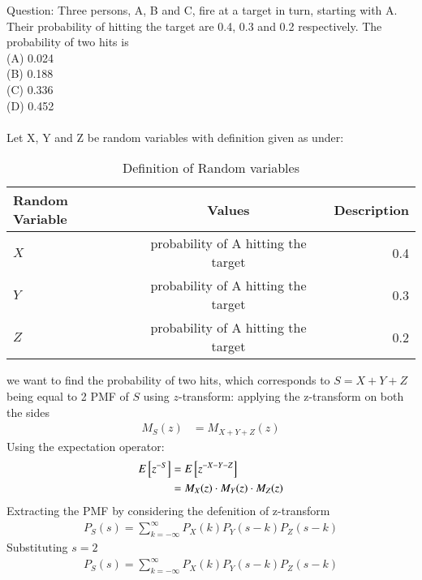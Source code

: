 \documentclass[journal,12pt,onecolumn]{IEEEtran}
\theoremstyle{remark}
\begin{document}
\let\vec\mathbf




\vspace{3cm}



\bigskip

\renewcommand{\thefigure}{\theenumi}
\renewcommand{\thetable}{\theenumi}
Question: Three persons, A, B and C, fire at a target in turn, starting with A. Their probability of hitting the target are 0.4, 0.3 and 0.2 respectively. The probability of two hits is\\
(A) 0.024\\
(B) 0.188\\
(C) 0.336\\
(D) 0.452\\
\solution \\
Let X, Y and Z be random variables with definition given as under:
\begin{table}[h]
\centering
\begin{tabular}{|l|c|r|}
\hline
    Random Variable & Values & Description\\
    \hline
    $X$ & probability of A hitting the target & 0.4 \\
    \hline
    $Y$ & probability of A hitting the target & 0.3\\
    \hline
    $Z$ & probability of A hitting the target& 0.2\\
    \hline
\end{tabular}
\label{tab:ncert/12/13/3/76/}
\caption{Definition of Random variables}
\end{table}
we want to find the probability of two hits, which corresponds to $S = X + Y + Z $being equal to 2
PMF of $S$ using $z$-transform:
applying the z-transform on both the sides
\begin{align}
	M_S(z) &= M_{X+Y+Z}(z)
\end{align}
Using the expectation operator:
\begin{align}
	E{}\left[z^{-S}\right] &= E{}\left[z^{-X-Y-Z}\right]\\
	&= M_X(z)\cdot M_Y(z)\cdot M_Z(z)
\end{align}
Extracting the PMF by considering the defenition of z-transform
\begin{align}
P_S(s) = \sum_{k=-\infty}^{\infty} P_X(k)P_Y(s-k)P_Z(s-k)
\end{align}
Substituting $s = 2$
\begin{align}
P_S(s) = \sum_{k=-\infty}^{\infty} P_X(k)P_Y(s-k)P_Z(s-k)
\end{align}
\end{document}

